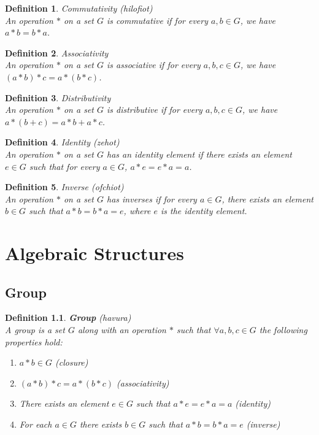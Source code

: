 \documentclass[11pt]{book} %
\newtheorem{definition}{Definition}[section]
\begin{document}
\begin{definition}{Commutativity (hilofiot)} \\
An operation \(*\) on a set \(G\) is commutative if for every \(a, b \in G\), we have \(a * b = b * a\).
\end{definition}

\begin{definition}{Associativity} \\
An operation \(*\) on a set \(G\) is associative if for every \(a, b, c \in G\), we have \((a * b) * c = a * (b * c)\).
\end{definition}

\begin{definition}{Distributivity} \\
An operation \(*\) on a set \(G\) is distributive if for every \(a, b, c \in G\), we have \(a * (b + c) = a * b + a * c\).
\end{definition}

\begin{definition}{Identity (zehot)} \\
An operation \(*\) on a set \(G\) has an identity element if there exists an element \(e \in G\) such that for every \(a \in G\), \(a * e = e * a = a\).
\end{definition}

\begin{definition}{Inverse (ofchiot)} \\
An operation \(*\) on a set \(G\) has inverses if for every \(a \in G\), there exists an element \(b \in G\) such that \(a * b = b * a = e\), where \(e\) is the identity element.
\end{definition}

\chapter{Algebraic Structures}
\section{Group}
\begin{definition}{\textbf{Group} (havura)} \\
A group is a set \(G\) along with an operation \(*\) such that $\forall a, b, c \in G$ the following properties hold:
\begin {enumerate}
    \item \(a * b \in G\) (closure)
    \item \((a * b) * c = a * (b * c)\) (associativity)
    \item There exists an element \(e \in G\) such that \(a * e = e * a = a\) (identity)
    \item For each \(a \in G\) there exists \(b \in G\) such that \(a * b = b * a = e\) (inverse)
\end{enumerate}
\end{definition}
\end{document}
